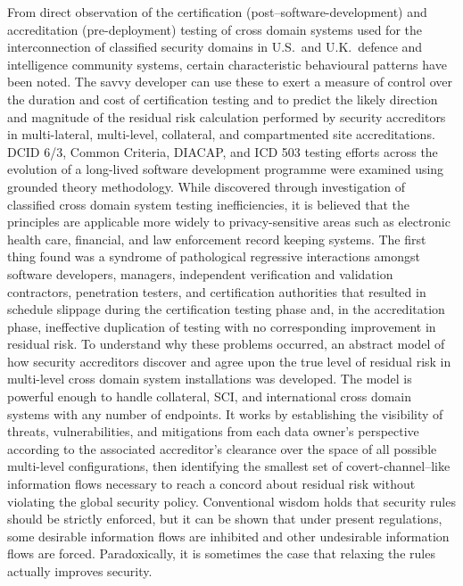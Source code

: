From direct observation of the certification (post--software-development) and accreditation
(pre-deployment) testing of cross domain systems used for the interconnection of classified
security domains in U.S.\ and U.K.\ defence and intelligence community systems, certain
characteristic
behavioural patterns have been noted.  The savvy developer can use these to exert a measure of
control over the duration and cost of certification testing and to predict the likely direction
and magnitude of the residual risk calculation performed by security accreditors in multi-lateral,
multi-level, collateral, and
compartmented site accreditations.  DCID 6/3, Common Criteria, DIACAP, and ICD 503 testing
efforts across the evolution of a long-lived software development programme were examined using
grounded theory methodology.  While discovered through investigation of classified cross domain
system testing inefficiencies, 
it is believed that the principles are applicable more widely to privacy-sensitive areas such as
electronic health care, financial, and law enforcement record keeping systems.
The first thing found was a syndrome of pathological regressive interactions amongst software
developers, managers, independent verification and validation contractors, penetration testers,
and certification authorities that resulted in schedule slippage during the certification testing
phase and, in the accreditation phase, ineffective duplication of testing with no corresponding
improvement in residual risk.  To understand why these problems occurred, an abstract model of
how security accreditors discover and agree upon the true level of residual risk in multi-level
cross domain system installations was developed.  The model is powerful enough to handle
collateral, SCI, and international cross domain systems with any number of endpoints.  It works
by establishing the visibility of threats, vulnerabilities, and mitigations from each data
owner's perspective according to the associated accreditor's clearance over the space of all
possible multi-level configurations, then identifying the smallest set of covert-channel--like
information flows necessary to reach a concord about residual risk without violating the global
security policy.
Conventional wisdom holds that security rules should be strictly enforced, but it can be shown
that under present regulations, some desirable information flows are inhibited and other
undesirable information flows are forced.  Paradoxically, it is sometimes the case that relaxing
the rules actually improves security.

